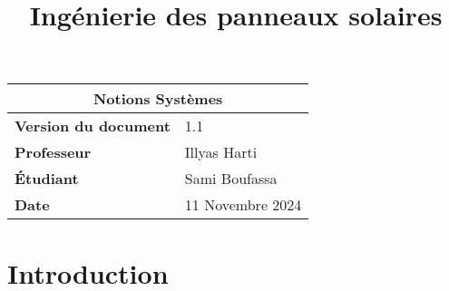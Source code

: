 \documentclass{article}
\title{Ingénierie des panneaux solaires}
\author{}
\date{\vspace{-5ex}}
\begin{document}
\maketitle

\begin{center}
    \begin{tabular}{|l|l|}
        \hline
        \multicolumn{2}{|c|}{\textbf{Notions Systèmes}} \\
        \hline
        \textbf{Version du document} & 1.1 \\
        \hline
        \textbf{Professeur} & Illyas Harti\\
        \hline
        \textbf{Étudiant} & Sami Boufassa\\
                            
        \hline
        \textbf{Date} & 11 Novembre 2024 \\
        \hline
    \end{tabular}
\end{center}

\tableofcontents

\newpage

\section{Introduction}


\subsection{}


\subsection{}

\subsection{}


\section{}


\subsection{}
\subsection{}
\end{document}
